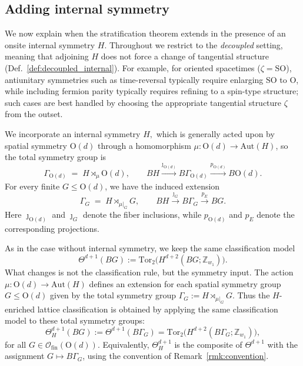 \documentclass[aps,prx,reprint,superscriptaddress,twocolumn,amsmath,amssymb,amsfonts, nofootinbib]{revtex4-2}
\newcommand{\SO}{\text{SO}}
\newcommand{\ofin}{\mathcal{O}_{\text{fin}}}
\newcommand{\tor}{\text{Tor}}
\newcommand{\Z}{\mathbb{Z}}
\theoremstyle{apsstyle}
\begin{document}
{\subsection{Adding internal symmetry}
\label{sec:internal_sym}

We now explain when the stratification theorem extends in the presence of an onsite internal symmetry $H$. Throughout we restrict to the \emph{decoupled} setting, meaning that adjoining $H$ does not force a change of tangential structure (Def.~\ref{def:decoupled_internal}). For example, for oriented spacetimes ($\zeta=\SO$), antiunitary symmetries such as time-reversal typically require enlarging $\SO$ to $\mathrm{O}$, while including fermion parity typically requires refining to a spin-type structure; such cases are best handled by choosing the appropriate tangential structure $\zeta$ from the outset.

\bigskip

We incorporate an internal symmetry $H,$ which is generally acted upon by spatial symmetry $\mathrm{O}(d)$ through a homomorphism
$\mu:\mathrm{O}(d)\to\mathrm{Aut}(H)$, so the total symmetry group is 
\begin{equation}
\Gamma_{\mathrm{O}(d)} \;=\; H\rtimes_{\mu} \mathrm{O}(d),\qquad
BH \xrightarrow[]{\jmath_{\mathrm{O}(d)}} B\Gamma_{\mathrm{O}(d)} \xrightarrow[]{p_{\mathrm{O}(d)}} B\mathrm{O}(d).
\label{eq:jmath_O}
\end{equation}
For every finite $G\le \mathrm{O}(d)$, we have the induced extension
\begin{equation}
\Gamma_{G} \;=\; H\rtimes_{\mu\vert_{G}} G,\qquad
BH \xrightarrow[]{\jmath_{G}} B\Gamma_{G} \xrightarrow[]{p_{E}} BG.
\label{eq:jmath_G}
\end{equation}
Here $\jmath_{\mathrm{O}(d)}$ and $\jmath_G$ denote the fiber inclusions, while
$p_{\mathrm{O}(d)}$ and $p_E$ denote the corresponding projections. 

As in the case without internal symmetry, we keep the same classification model
\begin{equation*}
\Theta^{d+1}(BG):=\tor_{2}\bigl(H^{d+2}(BG;\Z_{w_1})\bigr).
\end{equation*}
What changes is not the classification rule, but the symmetry input. The action $\mu:\mathrm{O}(d)\to \mathrm{Aut}(H)$ defines an extension for each spatial symmetry group $G\le \mathrm{O}(d)$ given by the total symmetry group $\Gamma_G:=H\rtimes_{\mu|_G}G$. Thus the $H$-enriched lattice classification is obtained by applying the same classification model to these total symmetry groups:
\begin{equation}
\Theta^{d+1}_{H}(BG):=\Theta^{d+1}(B\Gamma_G)
=\tor_{2}\bigl(H^{d+2}(B\Gamma_G;\Z_{w_1})\bigr),
\label{eq:class_H}
\end{equation}
for all $G\in \ofin(\mathrm{O}(d))$. Equivalently, $\Theta^{d+1}_{H}$ is the composite of $\Theta^{d+1}$ with the assignment $G\mapsto B\Gamma_G$, using the convention of Remark~\ref{rmk:convention}.

}
\end{document}
